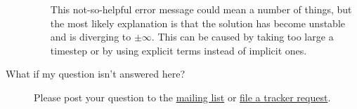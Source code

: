 \begin{description}
\begin{itemize}
            This not-so-helpful error message could mean a number of things,
            but the most likely explanation is that the solution has become
            unstable and is diverging to $\pm\infty$.  This can be caused by
            taking too large a timestep or by using explicit terms instead of
            implicit ones.
            
        \end{itemize}

    \item[What if my question isn't answered here?]  
        
        Please post your question to the 
        \href{http://www.ctcms.nist.gov/fipy/mail.html}{mailing list} or 
        \href{http://sourceforge.net/tracker/?group_id=118428}{file a tracker request}.
    

\end{description}
